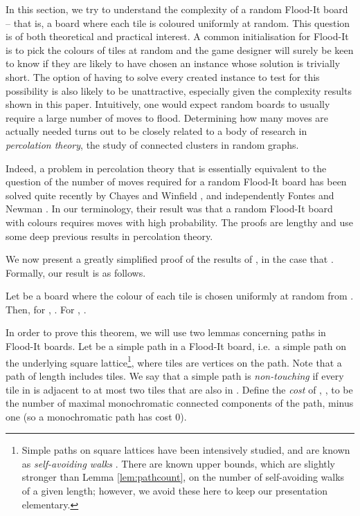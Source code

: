 \documentclass[a4paper,11pt]{llncs}
\newcounter{l}
\newcommand{\recdim}[2]{}
\begin{document}
In this section, we try to understand the complexity of a random Flood-It board -- that is, a board where each tile is coloured uniformly at random. This question is of both theoretical and practical interest. A common initialisation for Flood-It is to pick the colours of tiles at random and the game designer will surely be keen to know if they are likely to have chosen an instance whose solution is trivially short. The option of having to solve every created instance to test for this possibility is also likely to be unattractive, especially given the complexity results shown in this paper.  Intuitively, one would expect random boards to usually require a large number of moves to flood. Determining how many moves are actually needed turns out to be closely related to a body of research in {\em percolation theory}, the study of connected clusters in random graphs.

Indeed, a problem in percolation theory that is essentially equivalent to the question of the number of moves required for a random Flood-It board has been solved quite recently by Chayes and Winfield \cite{CW1993:random}, and independently Fontes and Newman \cite{FN1993:random}. In our terminology, their result was that a random \recdim{n}{n} Flood-It board with  colours requires  moves with high probability. The proofs are lengthy and use some deep previous results in percolation theory.

We now present a greatly simplified proof of the results of \cite{CW1993:random,FN1993:random}, in the case that . Formally, our result is as follows.

\begin{theorem}
    \label{thm:random}
    Let  be a board where the colour of each tile is chosen uniformly at random from . Then, for , . For , .
\end{theorem}

In order to prove this theorem, we will use two lemmas concerning paths in Flood-It boards. Let  be a simple path in a Flood-It board, i.e.\ a simple path on the underlying square lattice\footnote{Simple paths on square lattices have been intensively studied, and are known as {\em self-avoiding walks} \cite{MS1996:SAW}. There are known upper bounds, which are slightly stronger than Lemma \ref{lem:pathcount}, on the number of self-avoiding walks of a given length; however, we avoid these here to keep our presentation elementary.}, where tiles are vertices on the path. Note that a path of length  includes  tiles. We say that a simple path  is {\em non-touching} if every tile in  is adjacent to at most two tiles that are also in . Define the {\em cost} of , , to be the number of maximal monochromatic connected components of the path, minus one (so a monochromatic path has cost 0).
\end{document}
